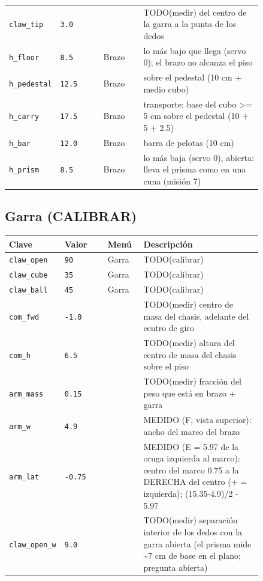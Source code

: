 \begin{longtable}{@{}p{0.2\linewidth}p{0.17\linewidth}lp{0.47\linewidth}@{}}
\texttt{claw\_\allowbreak{}tip} & \texttt{3.0} &  & TODO(medir) del centro de la garra a la punta de los dedos \\
\texttt{h\_\allowbreak{}floor} & \texttt{8.5} & Brazo & lo más bajo que llega (servo 0\textdegree{}); el brazo no alcanza el piso \\
\texttt{h\_\allowbreak{}pedestal} & \texttt{12.5} & Brazo & sobre el pedestal (10 cm + medio cubo) \\
\texttt{h\_\allowbreak{}carry} & \texttt{17.5} & Brazo & transporte: base del cubo >= 5 cm sobre el pedestal (10 + 5 + 2.5) \\
\texttt{h\_\allowbreak{}bar} & \texttt{12.0} & Brazo & barra de pelotas (10 cm) \\
\texttt{h\_\allowbreak{}prism} & \texttt{8.5} & Brazo & lo más baja (servo 0\textdegree{}), abierta: lleva el prisma como en una cuna (misión 7) \\
\bottomrule\end{longtable}
\subsection*{Garra (CALIBRAR)}
\begin{longtable}{@{}p{0.2\linewidth}p{0.17\linewidth}lp{0.47\linewidth}@{}}\toprule
\textbf{Clave} & \textbf{Valor} & \textbf{Men\'u} & \textbf{Descripci\'on} \\\midrule\endhead
\texttt{claw\_\allowbreak{}open} & \texttt{90} & Garra & TODO(calibrar) \\
\texttt{claw\_\allowbreak{}cube} & \texttt{35} & Garra & TODO(calibrar) \\
\texttt{claw\_\allowbreak{}ball} & \texttt{45} & Garra & TODO(calibrar) \\
\texttt{com\_\allowbreak{}fwd} & \texttt{-1.0} &  & TODO(medir) centro de masa del chasis, adelante del centro de giro \\
\texttt{com\_\allowbreak{}h} & \texttt{6.5} &  & TODO(medir) altura del centro de masa del chasis sobre el piso \\
\texttt{arm\_\allowbreak{}mass} & \texttt{0.15} &  & TODO(medir) fracción del peso que está en brazo + garra \\
\texttt{arm\_\allowbreak{}w} & \texttt{4.9} &  & MEDIDO (F, vista superior): ancho del marco del brazo \\
\texttt{arm\_\allowbreak{}lat} & \texttt{-0.75} &  & MEDIDO (E = 5.97 de la oruga izquierda al marco): centro del marco 0.75 a la DERECHA del centro (+ = izquierda); (15.35-4.9)/2 - 5.97 \\
\texttt{claw\_\allowbreak{}open\_\allowbreak{}w} & \texttt{9.0} &  & TODO(medir) separación interior de los dedos con la garra abierta (el prisma mide \textasciitilde{}7 cm de base en el plano; pregunta abierta) \\
\bottomrule\end{longtable}
